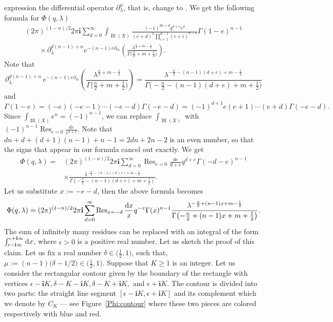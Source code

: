 \documentclass[pdftex]{sigma}
\numberwithin{equation}{section}
\newcommand{\ii}{\mathbf{i}}
\begin{document}
expression the differential operator $\partial_\lambda^n$, that is,
change  to . We get the following formula for $\Phi(q,\lambda)$
\begin{gather*}
(2\pi)^{(1-n)/2}
2\pi\ii
\sum_{d=0}^\infty
\int_{\operatorname{Bl}(X)}
\frac{(-1)^{dn+d} q^{d+e} e^2 }{
(e+d)^n
\prod_{i=1}^{d-1}(e +i)^{n-1} }
\Gamma(1-e )^{n-1}\\
\qquad\times
\partial_\lambda^{d(n-1)+n}
e^{-(n-1) e \partial_m}
\left(
\frac{\lambda^{\frac{n}{2}+m-\frac{1}{2} } }{
\Gamma\big( \frac{n}{2}+m+\frac{1}{2} \big) }
\right).
\end{gather*}
Note that
\[
\partial_\lambda^{d(n-1)+n} \,
e^{-(n-1) e \partial_m}
\left(
\frac{\lambda^{\frac{n}{2}+m-\frac{1}{2} } }{
\Gamma\big( \frac{n}{2}+m+\frac{1}{2} \big) }
\right) =
\frac{\lambda^{-\frac{n}{2}-(n-1)(d+e)+m-\frac{1}{2} } }{
\Gamma\big(-\frac{n}{2}-(n-1)(d+e)+m+\frac{1}{2} \big) }
\]
and
\[
\Gamma(1-e) = (-e)(-e-1)\cdots (-e-d)\Gamma(-e-d) = (-1)^{d+1}
e(e+1)\cdots (e+d) \Gamma(-e-d).
\]
Since $\int_{\operatorname{Bl}(X)} e^n = (-1)^{n-1}$, we can replace
$\int_{\operatorname{Bl}(X)}$ with $(-1)^{n-1}\operatorname{Res}_{e=0}
\frac{de}{e^{n+1}}$. Note that $dn+d +(d+1)(n-1) +n-1=2dn+2n-2$ is an
even number, so that the signs that appear in our formula cancel out
exactly. We get
\begin{align*}
\Phi(q,\lambda)={}&
(2\pi)^{(1-n)/2}
2\pi\ii
\sum_{d=0}^\infty
\operatorname{Res}_{e=0}
\frac{de}{d+e}
q^{d+e}\Gamma(-d-e)^{n-1}\\
&\times
\frac{\lambda^{-\frac{n}{2}-(n-1)(d+e)+m-\frac{1}{2} } }{
\Gamma(-\frac{n}{2}-(n-1)(d+e)+m+\frac{1}{2} ) }.
\end{align*}
Let us substitute $x:=-e-d$, then the above formula becomes
\[
\Phi(q,\lambda)=
(2\pi)^{(1-n)/2}
2\pi\ii
\sum_{d=0}^\infty
\operatorname{Res}_{x=-d}
\frac{{\rm d}x}{x}
q^{-x}\Gamma(x)^{n-1}
\frac{\lambda^{-\frac{n}{2}+(n-1)x+m-\frac{1}{2} } }{
\Gamma\bigl(-\frac{n}{2}+(n-1)x+m+\frac{1}{2} \bigr) }.
\]
The sum of infinitely many residues can be replaced with an integral
of the form $\int_{\epsilon-\ii \infty}^{\epsilon+\ii \infty} {\rm d}x$, where $\epsilon >0$ is a positive real number. Let us sketch the proof of this claim. Let us fix a real number
$\delta\in \big(\tfrac{1}{2},1\big)$, such that,
$\mu:=(n-1)\big(\delta-1/2\big)\in \big(\tfrac{1}{2},1\big)$. Suppose that $K\geq 1$ is an integer. Let us consider the rectangular contour given by the boundary of the rectangle with vertices $\epsilon-\ii K, \delta-K-\ii K, \delta-K+\ii K, $ and $\epsilon+\ii K$. The contour is divided into two parts: the straight line segment $[\epsilon-\ii K,\epsilon+\ii K]$ and its complement which we denote by $C_K$ --- see Figure~\ref{Phi:contour} where these two pieces are colored respectively with blue and red.
\end{document}
